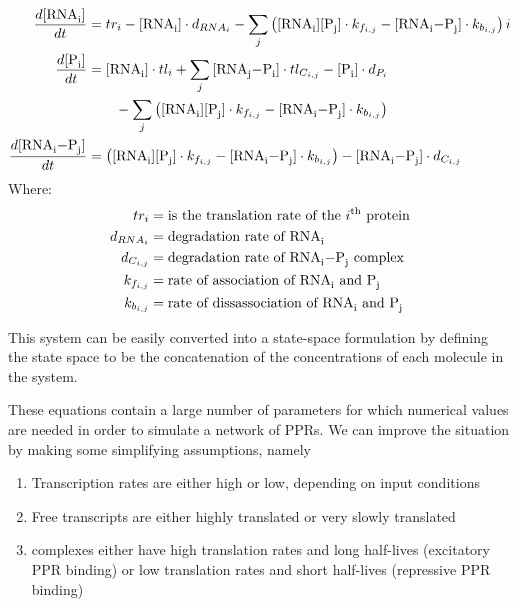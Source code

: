 \begin{align}
  \frac{d\cee{[RNA_i]}}{dt} &= tr_i 
    - \cee{[RNA_i]} \cdot d_{RNA_i} 
    - \sum_j \left(\cee{[RNA_i]}\cee{[P_j]} \cdot k_{f_{i,j}} 
      - \cee{[RNA_i-P_j]} \cdot k_{b_{i,j}} \right)  i
                                                  \nonumber \\
  \frac{d\cee{[P_i]}}{dt} &= 
    \cee{[RNA_i]}\cdot tl_i + \sum_j \cee{[RNA_j-P_i]}\cdot tl_{C_{i,j}} 
    - \cee{[P_i]}\cdot d_{P_i} \nonumber \\ 
    &\qquad {} - \sum_j \left(\cee{[RNA_i]}\cee{[P_j]} \cdot k_{f_{i,j}} 
      - \cee{[RNA_i-P_j]} \cdot k_{b_{i,j}} \right) 
                                                  \nonumber \\
  \frac{d\cee{[RNA_i-P_j]}}{dt} &=
      \left(\cee{[RNA_i]}\cee{[P_j]} \cdot k_{f_{i,j}} 
        - \cee{[RNA_i-P_j]} \cdot k_{b_{i,j}} \right)
      - \cee{[RNA_i-P_j]} \cdot d_{C_{i,j}}
                                                \label{eqn:reaction_equations}
\end{align}
%
Where:
%
\begin{align*}
  tr_i &= \text{is the translation rate of the $i^{\mathrm{th}}$ protein} \\
  d_{RNA_i} &= \text{degradation rate of \ce{RNA_i}} \\
  d_{C_{i,j}} &= \text{degradation rate of \ce{RNA_i-P_j} complex} \\
  k_{f_{i,j}}  &= \text{rate of association of \ce{RNA_i} and \ce{P_j}}\\
  k_{b_{i,j}} &= \text{rate of dissassociation of \ce{RNA_i} and \ce{P_j}}
\end{align*}

This system can be easily converted into a state-space formulation by defining
the state space to be the concatenation of the concentrations of each molecule
in the system.

These equations contain a large number of parameters for which numerical values
are needed in order to simulate a network of PPRs.
We can improve the situation by making some simplifying assumptions, namely
\begin{enumerate}
  \item \label{assm:transcription}
    Transcription rates are either high or low, depending on input conditions
  \item \label{assm:translation}
    Free  transcripts are either highly translated or very slowly
    translated
  \item \label{assm:complex}
     complexes either have high translation rates and long half-lives
    (excitatory PPR binding) or low translation rates and short half-lives
    (repressive PPR binding)
\end{enumerate}

